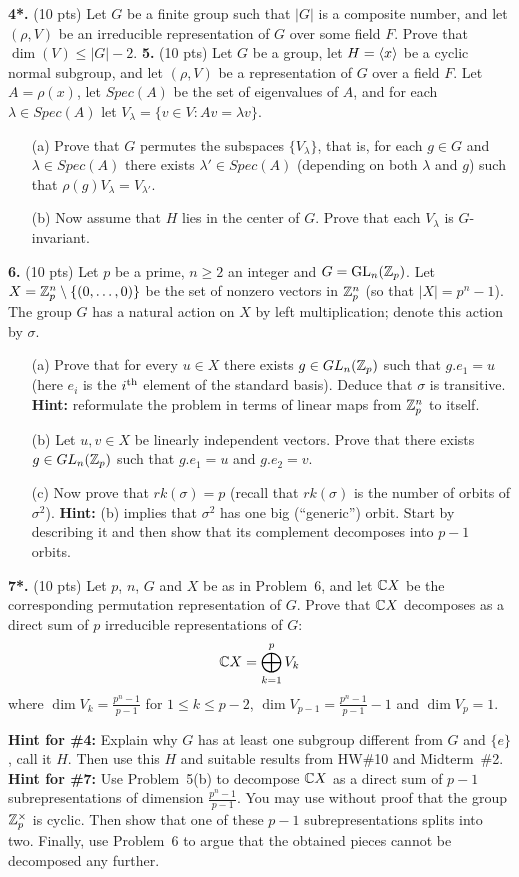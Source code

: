 \documentclass[12pt]{amsart}
\begin{document}
\skv
{\bf 4*.} (10 pts) Let $G$ be a finite group such that $|G|$ is a composite number, and let $(\rho,V)$ be an irreducible representation of $G$ over some field $F$. Prove that $\dim(V)\leq |G|-2$.
\skv
{\bf 5.} (10 pts) Let $G$ be a group, let $H={\langle} x{\rangle}$ be a cyclic normal subgroup, and let $(\rho,V)$ be a representation of $G$ over a field $F$. Let $A=\rho(x)$, let 
$Spec(A)$ be the set of eigenvalues of $A$,
and for each $\lambda\in Spec(A)$ let
$V_{\lambda}=\{v\in V: Av=\lambda v\}$.
\begin{itemize}
\item[(a)] Prove that $G$ permutes the subspaces 
$\{V_{\lambda}\}$, that is, for each $g\in G$ and $\lambda\in Spec(A)$
there exists $\lambda'\in Spec(A)$ (depending on both $\lambda$ and $g$)
such that $\rho(g)V_{\lambda}= V_{\lambda'}$.
\item[(b)] Now assume that $H$ lies in the center of $G$. Prove that
each $V_{\lambda}$ is $G$-invariant.
\end{itemize}
\skv
{\bf 6.} (10 pts)
Let $p$ be a prime, $n\geq 2$ an integer and $G={\rm GL}_n({\mathbb Z}_p)$. Let 
$X={\mathbb Z}_p^n\setminus \{(0,\ldots, 0)\}$ be the set of nonzero vectors in ${\mathbb Z}_p^n$ (so that $|X|=p^n-1$).
The group $G$ has a natural action on $X$ by left multiplication; denote this action by $\sigma$.
\begin{itemize}
\item[(a)] Prove that for every $u\in X$ there exists $g\in GL_n({\mathbb Z}_p)$ such that $g.e_1=u$ 
(here $e_i$ is the $i^{\rm th}$ element of the standard basis). Deduce that $\sigma$ is transitive. {\bf Hint:} reformulate the
problem in terms of linear maps from ${\mathbb Z}_p^n$ to itself.
\item[(b)] Let $u,v\in X$ be linearly independent vectors. Prove that there exists $g\in GL_n({\mathbb Z}_p)$
such that $g.e_1=u$ and $g.e_2=v$.
\item[(c)] Now prove that $rk(\sigma)=p$ (recall that $rk(\sigma)$ is the number of orbits of $\sigma^2$). 
{\bf Hint:} (b) implies that $\sigma^2$ has one big (``generic'') orbit. Start by describing it and then
show that its complement decomposes into $p-1$ orbits.
\end{itemize}

\skv
{\bf 7*.} (10 pts) Let $p$, $n$, $G$ and $X$ be as in Problem~6,
and let ${\mathbb C} X$ be the corresponding permutation representation of $G$. Prove that ${\mathbb C} X$ decomposes as a direct sum of $p$ irreducible
representations of $G$:
$${\mathbb C} X=\bigoplus_{k=1}^p V_k$$
where $\dim V_k=\frac{p^n-1}{p-1}$ for $1\leq k\leq p-2$, $\dim V_{p-1}=\frac{p^n-1}{p-1}-1$ and
$\dim V_p=1$.
\skv

\newpage
{\bf Hint for \#4:} Explain why $G$ has at least one subgroup different from $G$ and $\{e\}$, call it $H$. Then use this $H$ and suitable results from HW\#10 and Midterm~\#2.
\newpage
{\bf Hint for \#7:} Use Problem~5(b) to decompose ${\mathbb C} X$ as a direct sum of $p-1$ subrepresentations
of dimension $\frac{p^n-1}{p-1}$. You may use without proof that the group ${\mathbb Z}_p^{\times}$ is cyclic. Then show that one of these $p-1$ subrepresentations splits into two. Finally, use Problem~6 to argue that the obtained pieces cannot be decomposed any further. 
\end{document}
